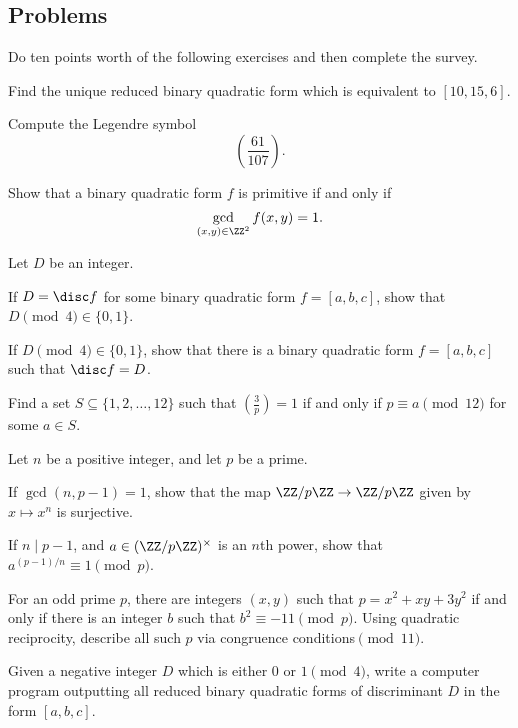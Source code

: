 \documentclass[../notes.tex]{subfiles}
\begin{document}
\subsection{Problems}
Do ten points worth of the following exercises and then complete the survey.
\begin{prob}[1 point]
	Find the unique reduced binary quadratic form which is equivalent to $[10,15,6]$.
\end{prob}
\begin{prob}[2 point]
	Compute the Legendre symbol
	\[\left(\frac{61}{107}\right).\]
\end{prob}
\begin{prob}[2 points] \label{prob:more-intinsic-primitive}
	Show that a binary quadratic form $f$ is primitive if and only if
	\[\gcd_{(x,y)\in\ZZ^2}f(x,y)=1.\]
\end{prob}
\begin{prob}[2 points]
	Let $D$ be an integer.
	\begin{listalph}
		\item If $D=\disc f$ for some binary quadratic form $f=[a,b,c]$, show that $D\pmod4\in\{0,1\}$.
		\item If $D\pmod4\in\{0,1\}$, show that there is a binary quadratic form $f=[a,b,c]$ such that $\disc f=D$.
	\end{listalph}
\end{prob}
\begin{prob}[3 points]
	Find a set $S\subseteq\{1,2,\ldots,12\}$ such that $\left(\frac3p\right)=1$ if and only if $p\equiv a\pmod{12}$ for some $a\in S$.
\end{prob}
\begin{prob}[3 points]
	Let $n$ be a positive integer, and let $p$ be a prime.
	\begin{listalph}
		\item If $\gcd(n,p-1)=1$, show that the map $\ZZ/p\ZZ\to\ZZ/p\ZZ$ given by $x\mapsto x^n$ is surjective.
		\item If $n\mid p-1$, and $a\in(\ZZ/p\ZZ)^\times$ is an $n$th power, show that $a^{(p-1)/n}\equiv1\pmod p$.
	\end{listalph}
\end{prob}
\begin{prob}[5 points]
	For an odd prime $p$, there are integers $(x,y)$ such that $p=x^2+xy+3y^2$ if and only if there is an integer $b$ such that $b^2\equiv-11\pmod p$. Using quadratic reciprocity, describe all such $p$ via congruence conditions$\pmod{11}$.
\end{prob}
\begin{prob}[5 points]
	Given a negative integer $D$ which is either $0$ or $1\pmod4$, write a computer program outputting all reduced binary quadratic forms of discriminant $D$ in the form $[a,b,c]$.
\end{prob}
\end{document}
